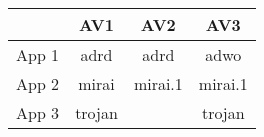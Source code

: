\begin{tabular}{c|c c c}
    & AV1 & AV2 & AV3 \\
    \hline
    App 1 & adrd & adrd & adwo \\
    App 2 & mirai & mirai.1 & mirai.1 \\
    App 3 & trojan & & trojan \\
\end{tabular}
